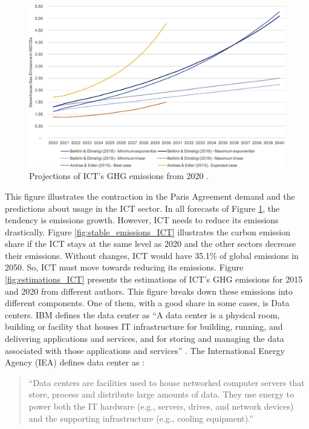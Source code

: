 \begin{figure}[!htb]
    \centering
    \includegraphics[scale=1]{Images/Related_works/gr4_lrg.jpg}
    \caption{Projections of ICT's GHG emissions from 2020 \cite{freitag2021climate}.}
    \label{fig:projections_ICT}
\end{figure}

This figure illustrates the contraction in the Paris Agreement demand and the predictions about usage in the ICT sector. In all forecasts of Figure \ref{fig:projections_ICT}, the tendency is emissions growth. However, ICT needs to reduce its emissions drastically. Figure \ref{fig:stable_emissions_ICT} illustrates the carbon emission share if the ICT stays at the same level as 2020 and the other sectors decrease their emissions. Without changes, ICT would have 35.1\% of global emissions in 2050. So, ICT must move towards reducing its emissions. Figure \ref{fig:estimations_ICT} presents the estimations of ICT's GHG emissions for 2015 and 2020 from different authors. This figure breaks down these emissions into different components. One of them, with a good share in some cases, is Data centers. IBM defines the data center as ``A data center is a physical room, building or facility that houses IT infrastructure for building, running, and delivering applications and services, and for storing and managing the data associated with those applications and services'' \cite{datacenterIBM}. The International Energy Agency (IEA) defines data center as \cite{centres2022data}:
\begin{quote}
    ``Data centers are facilities used to house networked computer servers that store, process and distribute large amounts of data. They use energy to power both the IT hardware (e.g., servers, drives, and network devices) and the supporting infrastructure (e.g., cooling equipment).''
\end{quote}

